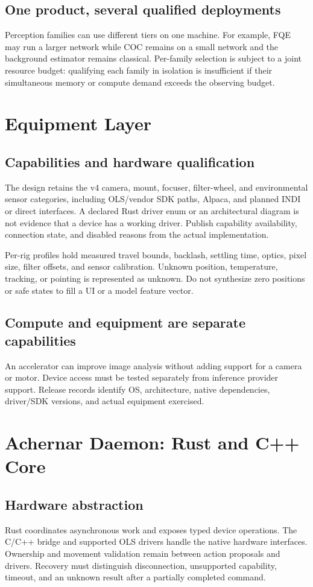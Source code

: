 \documentclass[11pt,a4paper]{article}
\begin{document}
\subsection{One product, several qualified deployments}
Perception families can use different tiers on one machine. For example, FQE
may run a larger network while COC remains on a small network and the background
estimator remains classical. Per-family selection is subject to a joint resource
budget: qualifying each family in isolation is insufficient if their simultaneous
memory or compute demand exceeds the observing budget.

\section{Equipment Layer}
\subsection{Capabilities and hardware qualification}
The design retains the v4 camera, mount, focuser, filter-wheel, and environmental
sensor categories, including OLS/vendor SDK paths, Alpaca, and planned INDI or
direct interfaces. A declared Rust driver enum or an architectural diagram is
not evidence that a device has a working driver. Publish capability availability,
connection state, and disabled reasons from the actual implementation.

Per-rig profiles hold measured travel bounds, backlash, settling time, optics,
pixel size, filter offsets, and sensor calibration. Unknown position,
temperature, tracking, or pointing is represented as unknown. Do not synthesize
zero positions or safe states to fill a UI or a model feature vector.

\subsection{Compute and equipment are separate capabilities}
An accelerator can improve image analysis without adding support for a camera
or motor. Device access must be tested separately from inference provider
support. Release records identify OS, architecture, native dependencies,
driver/SDK versions, and actual equipment exercised.

\section{Achernar Daemon: Rust and C++ Core}
\subsection{Hardware abstraction}
Rust coordinates asynchronous work and exposes typed device operations. The
C/C++ bridge and supported OLS drivers handle the native hardware interfaces.
Ownership and movement validation remain between action proposals and drivers.
Recovery must distinguish disconnection, unsupported capability, timeout, and
an unknown result after a partially completed command.
\end{document}
